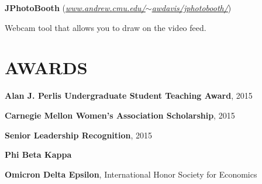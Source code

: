 \documentclass[margin, 11pt]{res} %
\begin{document}
\begin{resume}


\vspace{3pt}
{\bf JPhotoBooth} (\href{www.andrew.cmu.edu/~awdavis/jphotobooth/}{\sl www.andrew.cmu.edu/$\sim$awdavis/jphotobooth/})
\begin{itemize} \itemsep -2pt
{\small \item Webcam tool that allows you to draw on the video feed.}
\end{itemize}



\section{AWARDS}

{\bf Alan J. Perlis Undergraduate Student Teaching Award}, 2015

\vspace{6pt}

{\bf Carnegie Mellon Women's Association Scholarship}, 2015

\vspace{6pt}

{\bf Senior Leadership Recognition}, 2015

\vspace{6pt}



{\bf Phi Beta Kappa}

\vspace{6pt}

{\bf Omicron Delta Epsilon}, International Honor Society for Economics


\end{resume}
\end{document}

